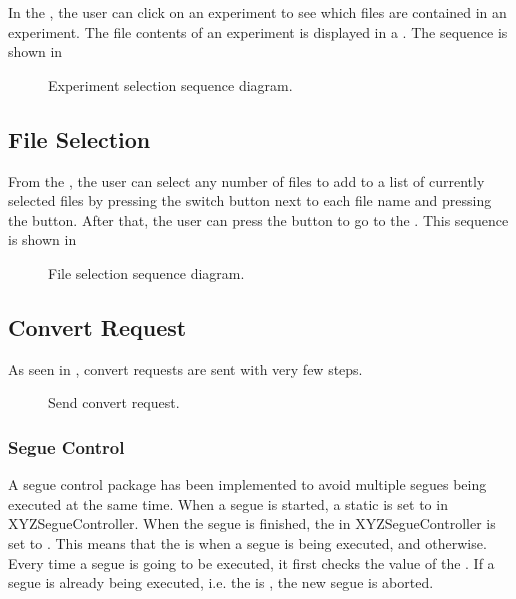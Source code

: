In the , the user can click on an experiment to see which files are contained in an experiment. The file contents of an experiment is displayed in a . The sequence is shown in  

\begin{figure}[ht]
\caption{Experiment selection sequence diagram.}
\label{fig:ios_sequence_experiment_selection}
\end{figure}

\subsection{File Selection}

From the , the user can select any number of files to add to a list of currently selected files by pressing the switch button next to each file name and pressing the  button. After that, the user can press the  button to go to the . This sequence is shown in 

\begin{figure}[ht]
\caption{File selection sequence diagram.}
\label{fig:ios_sequence_file_selection}
\end{figure}

\subsection{Convert Request}

As seen in , convert requests are sent with very few steps. 

\begin{figure}[ht]
\caption{Send convert request.}
\label{fig:ios_sequence_convert_request2}
\end{figure}
\FloatBarrier

\subsubsection{Segue Control}
A segue control package has been implemented to avoid multiple segues being executed at the same time. When a segue is started, a static  is set to  in XYZSegueController. When the segue is finished, the  in XYZSegueController is set to . This means that the  is  when a segue is being executed, and  otherwise. Every time a segue is going to be executed, it first checks the value of the . If a segue is already being executed, i.e. the  is , the new segue is aborted.

